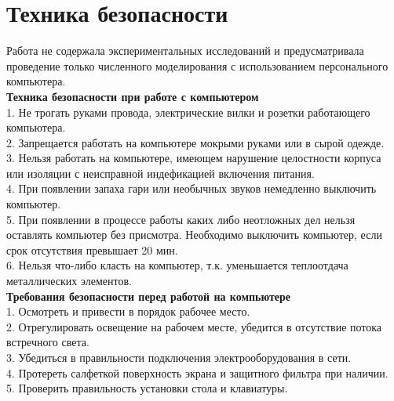 \chapter{Техника безопасности}

Работа не содержала экспериментальных исследований и предусматривала проведение только численного моделирования с использованием персонального компьютера.\\

\textbf{Техника безопасности при работе с компьютером}\\
1. Не трогать руками провода, электрические вилки и розетки работающего компьютера.\\
2. Запрещается  работать на компьютере мокрыми руками  или в сырой одежде.\\
3. Нельзя работать на компьютере, имеющем нарушение целостности корпуса или изоляции с неисправной индефикацией включения питания.\\
4. При появлении запаха гари или необычных звуков немедленно выключить компьютер.\\
5. При появлении  в процессе работы каких  либо неотложных дел нельзя оставлять компьютер без присмотра.  Необходимо выключить компьютер, если срок отсутствия превышает 20 мин.\\
6. Нельзя что-либо класть на компьютер, т.к. уменьшается теплоотдача металлических элементов.\\

\textbf{Требования безопасности перед работой на компьютере}\\
1. Осмотреть и привести в порядок рабочее место.\\
2. Отрегулировать освещение на рабочем месте, убедится в отсутствие потока встречного света.\\
3. Убедиться в правильности подключения электрооборудования в сети.\\
4. Протереть салфеткой поверхность экрана и защитного фильтра при наличии.\\
5. Проверить правильность установки стола и клавиатуры.\\

